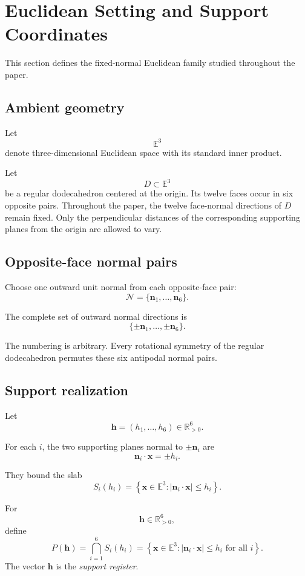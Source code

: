 \section{Euclidean Setting and Support Coordinates}

This section defines the fixed-normal Euclidean family studied throughout
the paper.

\subsection{Ambient geometry}

Let
\[
\mathbb E^3
\]
denote three-dimensional Euclidean space with its standard inner product.

Let
\[
D\subset\mathbb E^3
\]
be a regular dodecahedron centered at the origin. Its twelve faces occur in
six opposite pairs. Throughout the paper, the twelve face-normal directions
of \(D\) remain fixed. Only the perpendicular distances of the corresponding
supporting planes from the origin are allowed to vary.

\subsection{Opposite-face normal pairs}

Choose one outward unit normal from each opposite-face pair:
\[
\mathcal N
=
\{\mathbf n_1,\ldots,\mathbf n_6\}.
\]

The complete set of outward normal directions is
\[
\{\pm\mathbf n_1,\ldots,\pm\mathbf n_6\}.
\]

The numbering is arbitrary. Every rotational symmetry of the regular
dodecahedron permutes these six antipodal normal pairs.

\subsection{Support realization}

Let
\[
\mathbf h=(h_1,\ldots,h_6)\in\mathbb R_{>0}^6.
\]

For each \(i\), the two supporting planes normal to
\(\pm\mathbf n_i\) are
\[
\mathbf n_i\cdot\mathbf x=\pm h_i.
\]

They bound the slab
\[
S_i(h_i)
=
\left\{
\mathbf x\in\mathbb E^3:
|\mathbf n_i\cdot\mathbf x|\le h_i
\right\}.
\]

\begin{definition}
For
\[
\mathbf h\in\mathbb R_{>0}^6,
\]
define
\[
P(\mathbf h)
=
\bigcap_{i=1}^{6}S_i(h_i)
=
\left\{
\mathbf x\in\mathbb E^3:
|\mathbf n_i\cdot\mathbf x|\le h_i
\text{ for all }i
\right\}.
\]
The vector \(\mathbf h\) is the \emph{support register}.
\end{definition}

